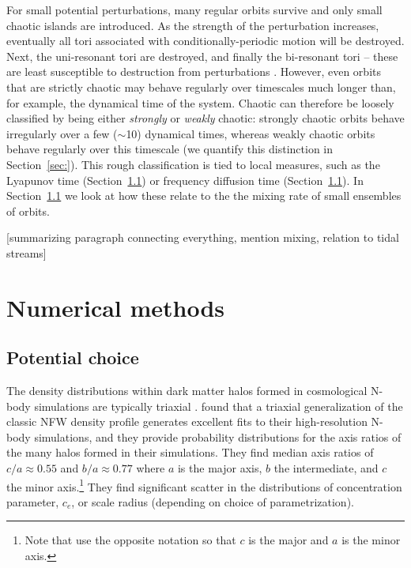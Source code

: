 \documentclass[letterpaper,12pt,preprint]{aastex}
\begin{document}
For small potential perturbations, many regular orbits survive and only small chaotic islands are introduced. As the strength of the perturbation increases, eventually all tori associated with conditionally-periodic motion will be destroyed. Next, the uni-resonant tori are destroyed, and finally the bi-resonant tori -- these are least susceptible to destruction from perturbations \citep[e.g., see][]{valluri98}. However, even orbits that are strictly chaotic may behave regularly over timescales much longer than, for example, the dynamical time of the system. Chaotic can therefore be loosely classified by being either \emph{strongly} or \emph{weakly} chaotic: strongly chaotic orbits behave irregularly over a few ($\sim$10) dynamical times, whereas weakly chaotic orbits behave regularly over this timescale (we quantify this distinction in Section~\ref{sec:}). This rough classification is tied to local measures, such as the Lyapunov time (Section~\ref{}) or frequency diffusion time (Section~\ref{}). In Section~\ref{} we look at how these relate to the the mixing rate of small ensembles of orbits.

[summarizing paragraph connecting everything, mention mixing, relation to tidal streams]

\section{Numerical methods}

\subsection{Potential choice}

The density distributions within dark matter halos formed in cosmological N-body simulations are typically triaxial \citep[e.g.,][]{jing02, bett07, zemp09, veraciro11}. \citet{jing02} found that a triaxial generalization of the classic NFW density profile \citep{navarro96} generates excellent fits to their high-resolution N-body simulations, and they provide probability distributions for the axis ratios of the many halos formed in their simulations. They find median axis ratios of $c/a \approx 0.55$ and $b/a \approx 0.77$ where $a$ is the major axis, $b$ the intermediate, and $c$ the minor axis.\footnote{Note that \citet{jing02} use the opposite notation so that $c$ is the major and $a$ is the minor axis.} They find significant scatter in the distributions of concentration parameter, $c_e$, or scale radius (depending on choice of parametrization). 
\end{document}
